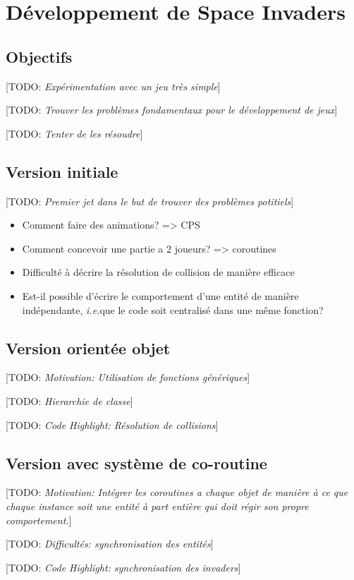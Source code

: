 \documentclass[12pt,oneside,letterpaper,francais]{book}
\newcommand{\todo}[1]{[TODO: {\it #1}]}
\newcommand{\ie}{{\textit{i.e.}}}
\begin{document}
\section{Développement de \og Space Invaders \fg}

\subsection{Objectifs}
\todo{Expérimentation avec un jeu très simple}

\todo{Trouver les problèmes fondamentaux pour le développement de jeux}

\todo{Tenter de les résoudre}

\subsection{Version initiale}
\todo{Premier jet dans le but de trouver des problèmes potitiels}

\begin{itemize}
\item Comment faire des animations? => CPS
\item Comment concevoir une partie a 2 joueurs? => coroutines
\item Difficulté à décrire la résolution de collision de manière
  efficace 
\item Est-il possible d'écrire le comportement d'une entité de manière
  indépendante, \ie que le code soit centralisé dans une même
  fonction?
\end{itemize}

\subsection{Version orientée objet}
\todo{Motivation: Utilisation de fonctions génériques}

\todo{Hierarchie de classe}

\todo{Code Highlight: Résolution de collisions}


\subsection{Version avec système de co-routine}
\todo{Motivation: Intégrer les coroutines a chaque objet de manière à
  ce que chaque instance soit une entité à part entière qui doit régir
  son propre comportement.}

\todo{Difficultés: synchronisation des entités}

\todo{Code Highlight: synchronisation des invaders}
\end{document}
